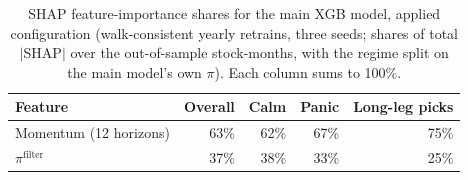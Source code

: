 \begin{table}[htbp]
\centering
\begin{tabular}{l r r r r}
\toprule
Feature & Overall & Calm & Panic & Long-leg picks \\
\midrule
Momentum (12 horizons) & 63\% & 62\% & 67\% & 75\% \\
$\pi^{\text{filter}}$ & 37\% & 38\% & 33\% & 25\% \\
\bottomrule
\end{tabular}
\caption{SHAP feature-importance shares for the main XGB model, applied configuration (walk-consistent yearly retrains, three seeds; shares of total $|$SHAP$|$ over the out-of-sample stock-months, with the regime split on the main model's own $\pi$). Each column sums to 100\%.}
\label{tab:shap}
\end{table}
